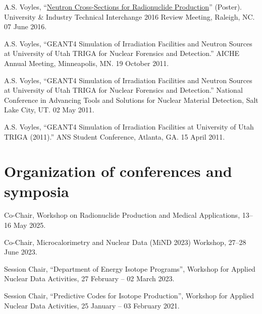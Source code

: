 \begin{bibsection}
\item A.S. Voyles, \enquote{\href{https://github.com/avoyles/posters/blob/master/2016-06-07-UITI/Voyles_UITI2016_Poster_OsloUpdate.pdf}{Neutron Cross-Sections for Radionuclide Production}} (Poster).  University \& Industry Technical Interchange 2016 Review Meeting, Raleigh, NC. 07 June 2016.

\item A.S. Voyles, \enquote{GEANT4 Simulation of Irradiation Facilities and Neutron Sources at University of Utah TRIGA for
Nuclear Forensics and Detection.}  AICHE Annual Meeting, Minneapolis, MN. 19 October 2011.

\item A.S. Voyles, \enquote{GEANT4 Simulation of Irradiation Facilities and Neutron Sources at University of Utah TRIGA for
Nuclear Forensics and Detection.}   National Conference in Advancing Tools and Solutions for
Nuclear Material Detection, Salt Lake City, UT. 02 May 2011.

\item A.S. Voyles, \enquote{GEANT4 Simulation of Irradiation Facilities at University of Utah TRIGA (2011).} 
ANS Student Conference, Atlanta, GA. 15 April 2011.

\end{bibsection}


\section{\sc Organization of conferences and symposia}

\begin{list2}

\item Co-Chair,  Workshop on Radionuclide Production and Medical Applications,  13--16 May 2025.


\item Co-Chair,  Microcalorimetry and Nuclear Data (MiND 2023) Workshop,  27--28 June 2023.

\item Session Chair, \enquote{Department of Energy Isotope Programs}, Workshop for Applied Nuclear Data Activities,  27 February -- 02 March 2023.

\item Session Chair, \enquote{Predictive Codes for Isotope Production}, Workshop for Applied Nuclear Data Activities,  25 January -- 03 February 2021.

\end{list2}
